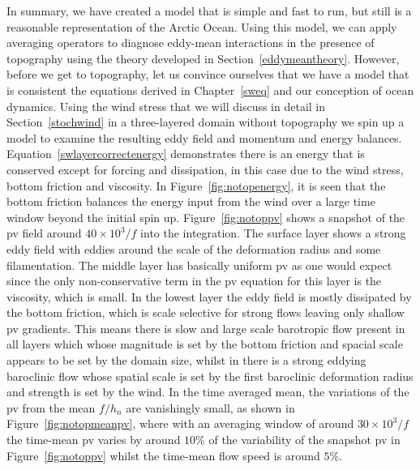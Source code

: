 \documentclass[12pt,a4paper]{report}
\newcommand*\figref[1]{Figure~\ref{#1}}
\newcommand*\equref[1]{Equation~\eqref{#1}}
\newcommand*\secref[1]{Section~\ref{#1}}
\begin{document}
  In summary, we have created a model that is simple and fast to run, but still is a
  reasonable representation of the Arctic Ocean. Using this model, we can apply 
  averaging operators to diagnose eddy-mean interactions in the 
  presence of topography using the theory developed
  in \secref{eddymeantheory}. However, before we get to topography, let us convince
  ourselves that we have a model that is consistent the equations derived in
  Chapter~\ref{sweq} and our conception of ocean dynamics. 
  Using the wind stress that we will discuss in detail in \secref{stochwind} in
  a three-layered domain without topography we spin up a model to examine the 
  resulting eddy field and momentum and energy balances. 
  \equref{swlayercorrectenergy} demonstrates there is an energy that is conserved 
  except for forcing and dissipation, in this case due to
   the wind stress, bottom 
  friction and viscosity. In \figref{fig:notopenergy}, it
  is seen that 
  the bottom friction balances the energy input from the wind over a large time
  window beyond the initial spin up. \figref{fig:notoppv} shows a snapshot of the \gls{pv}
  field around $40 \times 10^{3}/f$ into the integration. The surface layer shows a strong eddy
  field with eddies around the scale of the deformation radius and some filamentation.
  The middle layer has basically uniform \gls{pv} as one would expect since 
  the only non-conservative term in the \gls{pv} equation for this layer is the
  viscosity, which is small. In the lowest layer the eddy field is mostly dissipated
  by the bottom friction, which is scale selective for strong flows leaving only shallow
  \gls{pv} gradients. This means there is slow and large scale barotropic flow
  present in all layers which whose magnitude is set by the bottom friction and spacial
  scale appears to be set by the domain size, whilst in there is a strong eddying 
  baroclinic flow whose spatial scale is set by the first baroclinic deformation radius
  and strength is set by the wind. In the time averaged mean, the variations of the
   \gls{pv} from the mean $f/h_{n}$ are vanishingly small, as shown in \figref{fig:notopmeanpv}, where with an averaging window of around $30 \times 10^{3}/f$
   the time-mean \gls{pv} varies by around $10 \%$ of the variability of the snapshot 
   \gls{pv} in \figref{fig:notoppv} whilst the time-mean flow speed is around $5 \%$.
  
  
  
\end{document}
